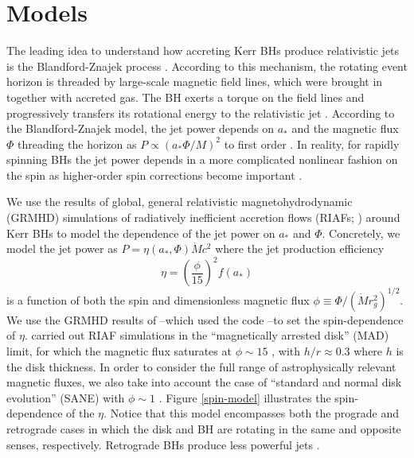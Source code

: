 \documentclass[twocolumn, linenumbers]{aastex62} %
\begin{document}





\section{Models}    \label{models}

The leading idea to understand how accreting Kerr BHs produce relativistic jets is the Blandford-Znajek process \citep{Blandford1977, Blandford2019}. According to this mechanism, the rotating event horizon is threaded by large-scale magnetic field lines, which were brought in together with accreted gas. %
The BH exerts a torque on the field lines and progressively transfers its rotational energy to the relativistic jet . According to the Blandford-Znajek model, the jet power depends on $a_*$ and the magnetic flux $\Phi$ threading the horizon as $P \propto ( a_* \Phi/M )^2$ to first order \citep{Blandford1977}. In reality, for rapidly spinning BHs the jet power depends in a more complicated nonlinear fashion on the spin as higher-order spin corrections become important . 

We use the results of global, general relativistic magnetohydrodynamic (GRMHD) simulations of radiatively inefficient accretion flows (RIAFs; \citealt{Yuan2014}) around Kerr BHs to model the dependence of the jet power on $a_*$ and $\Phi$. Concretely, we model the jet power as $P = \eta(a_*, \Phi) \dot{M} c^2$ where the jet production efficiency 
\begin{equation}
\eta = \left( \frac{\phi}{15} \right)^2 f(a_*)
\end{equation}
is a function of both the spin and dimensionless magnetic flux $\phi \equiv \Phi/(\dot{M} r_g^2)^{1/2}$. We use the GRMHD results of \cite{Sasha2012a}--which used the  code \citep{Gammie2003}--to set the spin-dependence of $\eta$. \cite{Sasha2012a} carried out RIAF simulations in the ``magnetically arrested disk'' (MAD) limit, for which the magnetic flux saturates at $\phi \sim 15$ \citep{Narayan2003, Sasha2011}, with $h/r \approx 0.3$ where $h$ is the disk thickness. In order to consider the full range of astrophysically relevant magnetic fluxes, we also take into account the case of  ``standard and normal disk evolution'' (SANE) with $\phi \sim 1$ . Figure  \ref{spin-model} illustrates the spin-dependence of the $\eta$. Notice that this model encompasses both the prograde and retrograde cases in which the disk and BH are rotating in the same and opposite senses, respectively. Retrograde BHs produce less powerful jets \citep{Sasha2012}.
\end{document}
